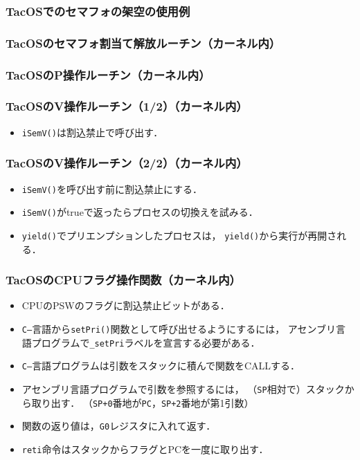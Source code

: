 \documentclass[dvipdfmx]{beamer}
\begin{document}
\begin{frame}
  \frametitle{TacOSでのセマフォの架空の使用例}
  
\end{frame}

\begin{frame}
  \frametitle{TacOSのセマフォ割当て解放ルーチン（カーネル内）}
  
\end{frame}

\begin{frame}
  \frametitle{TacOSのP操作ルーチン（カーネル内）}
  
\end{frame}

\begin{frame}
  \frametitle{TacOSのV操作ルーチン（1/2）（カーネル内）}
  
  \begin{itemize}
  \item {\tt iSemV()}は割込禁止で呼び出す．
  \end{itemize}
\end{frame}

\begin{frame}
  \frametitle{TacOSのV操作ルーチン（2/2）（カーネル内）}
  
  \begin{itemize}
  \item {\tt iSemV()}を呼び出す前に割込禁止にする．
  \item {\tt iSemV()}がtrueで返ったらプロセスの切換えを試みる．
  \item {\tt yield()}でプリエンプションしたプロセスは，
    {\tt yield()}から実行が再開される．
  \end{itemize}
\end{frame}

\begin{frame}
  \frametitle{TacOSのCPUフラグ操作関数（カーネル内）}
  
  \begin{itemize}
  \item CPUのPSWのフラグに割込禁止ビットがある．
  \item {\tt C--}言語から{\tt setPri()}関数として呼び出せるようにするには，
    アセンブリ言語プログラムで{\tt \_setPri}ラベルを宣言する必要がある．
  \item {\tt C--}言語プログラムは引数をスタックに積んで関数をCALLする．
  \item アセンブリ言語プログラムで引数を参照するには，
    （{\tt SP}相対で）スタックから取り出す．
    （{\tt SP+0}番地が{\tt PC}，{\tt SP+2}番地が第1引数）
  \item 関数の返り値は，{\tt G0}レジスタに入れて返す．
  \item {\tt reti}命令はスタックからフラグとPCを一度に取り出す．
  \end{itemize}
\end{frame}
\end{document}

